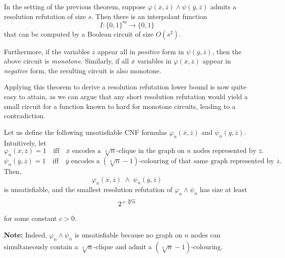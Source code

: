 \begin{theorem}
\label{thm:interpolation-circuit}
In the setting of the previous theorem, suppose 
\(\varphi(\overline{x},\overline{z}) \wedge \psi(\overline{y},\overline{z})\) 
admits a resolution refutation of size \(s\). Then there is an interpolant function 
\[
I \colon \{0,1\}^m \to \{0,1\}
\]
that can be computed by a Boolean circuit of size \(O(s^2)\).

Furthermore, if the variables \(\overline{z}\) appear all in \emph{positive} form in 
\(\psi(\overline{y},\overline{z})\), then the above circuit is \emph{monotone}. 
Similarly, if all \(\overline{x}\) variables in \(\varphi(\overline{x},\overline{z})\) 
appear in \emph{negative} form, the resulting circuit is also monotone.
\end{theorem}

Applying this theorem to derive a resolution refutation lower bound is now quite easy to attain, as we can argue that any short resolution refutation would yield a small circuit for a function known to hard for monotone circuits, leading to a contradiction.

\sloppy 

\begin{theorem}\label{thm:interpolation-lower-bound}
Let us define the following unsatisfiable CNF formulas \(\varphi_n(\overline{x},\overline{z})\) and \(\psi_n(\overline{y},\overline{z})\). Intuitively, let
\[
\varphi_n(\overline{x},\overline{z}) = 1 \quad\text{iff}\quad \overline{x} \text{ encodes a }\sqrt[4]{n}\text{-clique in the graph on }n\text{ nodes represented by }\overline{z}.
\]
\[
\psi_n(\overline{y},\overline{z}) = 1 \quad\text{iff}\quad \overline{y} \text{ encodes a }(\sqrt[4]{n}-1)\text{-colouring of that same graph represented by $\overline{z}$.}
\]
Then,
\[
\varphi_n(\overline{x},\overline{z}) \;\wedge\; \psi_n(\overline{y},\overline{z})
\]
is unsatisfiable, and the smallest resolution refutation of \(\varphi_n \wedge \psi_n\) has size at least
\[
2^{\,c\cdot\sqrt[8]{n}}
\]
for some constant \(c>0\).
\end{theorem}

\medskip
\noindent
\textbf{Note:} Indeed, \(\varphi_n \wedge \psi_n\) is unsatisfiable because no graph on \(n\) nodes can simultaneously contain a \(\sqrt[4]{n}\)-clique and admit a \((\sqrt[4]{n}-1)\)-colouring. 

\medskip

